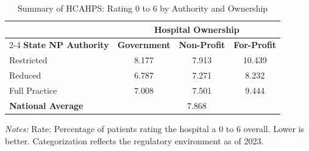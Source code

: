 \begin{table}[htbp]
    \centering
    \caption{Summary of HCAHPS: Rating 0 to 6 by Authority and Ownership}
    \label{tab:h_hosp_rating_0_6_own}
    \vspace{0.2cm}
    \begin{tabular}{lccc}
        \toprule
        & \multicolumn{3}{c}{\textbf{Hospital Ownership}} \\
        \cmidrule(lr){2-4}
        \textbf{State NP Authority} & \textbf{Government} & \textbf{Non-Profit} & \textbf{For-Profit} \\
        \midrule
        Restricted & 8.177 & 7.913 & 10.439 \\
        Reduced & 6.787 & 7.271 & 8.232 \\
        Full Practice & 7.008 & 7.501 & 9.444 \\
        \midrule
        \textbf{National Average} & \multicolumn{3}{c}{7.868} \\
        \bottomrule
    \end{tabular}
    \vspace{0.1cm}
    \begin{minipage}{0.85\textwidth}
        \footnotesize \textit{Notes:} Rate: Percentage of patients rating the hospital a 0 to 6 overall. Lower is better. Categorization reflects the regulatory environment as of 2023.
    \end{minipage}
\end{table}